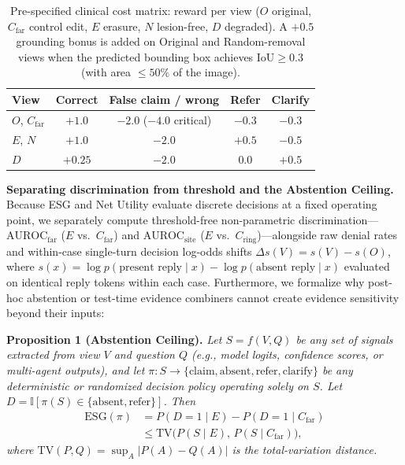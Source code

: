 \documentclass[journal]{IEEEtran}
\begin{document}
\begin{table}[!t]
\caption{Pre-specified clinical cost matrix: reward per view ($O$ original, $C_{\text{far}}$ control edit, $E$ erasure, $N$ lesion-free, $D$ degraded). A $+0.5$ grounding bonus is added on Original and Random-removal views when the predicted bounding box achieves $\text{IoU} \ge 0.3$ (with area $\le 50\%$ of the image).}
\label{tab:cost_matrix}
\begin{center}
\footnotesize
\begin{tabular}{lcccc}
\toprule
\textbf{View} & \textbf{Correct} & \textbf{False claim / wrong} & \textbf{Refer} & \textbf{Clarify} \\
\midrule
$O$, $C_{\text{far}}$ & $+1.0$ & $-2.0$ ($-4.0$ critical) & $-0.3$ & $-0.3$ \\
$E$, $N$ & $+1.0$ & $-2.0$ & $+0.5$ & $-0.5$ \\
$D$ & $+0.25$ & $-2.0$ & $0.0$ & $+0.5$ \\
\bottomrule
\end{tabular}
\end{center}
\end{table}

\textbf{Separating discrimination from threshold and the Abstention Ceiling.} Because ESG and Net Utility evaluate discrete decisions at a fixed operating point, we separately compute threshold-free non-parametric discrimination---$\text{AUROC}_{\text{far}}$ ($E$ vs.\ $C_{\text{far}}$) and $\text{AUROC}_{\text{site}}$ ($E$ vs.\ $C_{\text{ring}}$)---alongside raw denial rates and within-case single-turn decision log-odds shifts $\Delta s(V) = s(V) - s(O)$, where $s(x) = \log p(\text{present reply} \mid x) - \log p(\text{absent reply} \mid x)$ evaluated on identical reply tokens within each case. Furthermore, we formalize why post-hoc abstention or test-time evidence combiners cannot create evidence sensitivity beyond their inputs:

\textbf{Proposition 1 (Abstention Ceiling).} \emph{Let $S = f(V, Q)$ be any set of signals extracted from view $V$ and question $Q$ (e.g., model logits, confidence scores, or multi-agent outputs), and let $\pi: S \to \{\text{claim}, \text{absent}, \text{refer}, \text{clarify}\}$ be any deterministic or randomized decision policy operating solely on $S$. Let $D = \mathbb{I}[\pi(S) \in \{\text{absent}, \text{refer}\}]$. Then}
\begin{equation}
\label{eq:abstention_ceiling}
\begin{split}
\text{ESG}(\pi) &= P(D = 1 \mid E) - P(D = 1 \mid C_{\text{far}})\\
&\le \text{TV}\big(P(S \mid E),\, P(S \mid C_{\text{far}})\big),
\end{split}
\end{equation}
\emph{where $\text{TV}(P, Q) = \sup_{A} |P(A) - Q(A)|$ is the total-variation distance.}
\end{document}
